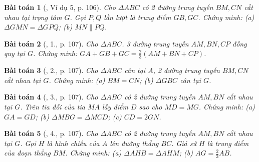 \documentclass{article}
\newtheorem{baitoan}{Bài toán}
\begin{document}
\begin{baitoan}[\cite{SGK_Toan_7_Canh_Dieu_tap_2}, Ví dụ 5, p. 106]
	Cho $\Delta ABC$ có 2 đường trung tuyến $BM,CN$ cắt nhau tại trọng tâm $G$. Gọi $P,Q$ lần lượt là trung điểm $GB,GC$. Chứng minh: (a) $\Delta GMN = \Delta GPQ$; (b) $MN\parallel PQ$.
\end{baitoan}

\begin{baitoan}[\cite{SGK_Toan_7_Canh_Dieu_tap_2}, 1., p. 107]
	Cho $\Delta ABC$. 3 đường trung tuyến $AM,BN,CP$ đồng quy tại $G$. Chứng minh: $GA + GB + GC = \frac{2}{3}(AM + BN + CP)$.
\end{baitoan}

\begin{baitoan}[\cite{SGK_Toan_7_Canh_Dieu_tap_2}, 2., p. 107]
	Cho $\Delta ABC$ cân tại $A$, 2 đường trung tuyến $BM,CN$ cắt nhau tại $G$. Chứng minh: (a) $BM = CN$; (b) $\Delta GBC$ cân tại $G$.
\end{baitoan}

\begin{baitoan}[\cite{SGK_Toan_7_Canh_Dieu_tap_2}, 3., p. 107]
	Cho $\Delta ABC$ có 2 đường trung tuyến $AM,BN$ cắt nhau tại $G$. Trên tia đối của tia $MA$ lấy điểm $D$ sao cho $MD = MG$. Chứng minh: (a) $GA = GD$; (b) $\Delta MBG = \Delta MCD$; (c) $CD = 2GN$.
\end{baitoan}

\begin{baitoan}[\cite{SGK_Toan_7_Canh_Dieu_tap_2}, 4., p. 107]
	Cho $\Delta ABC$ có 2 đường trung tuyến $AM,BN$ cắt nhau tại $G$. Gọi $H$ là hình chiếu của $A$ lên đường thẳng $BC$. Giả sử $H$ là trung điểm của đoạn thẳng $BM$. Chứng minh: (a) $\Delta AHB = \Delta AHM$; (b) $AG = \frac{2}{3}AB$.
\end{baitoan}
\end{document}
